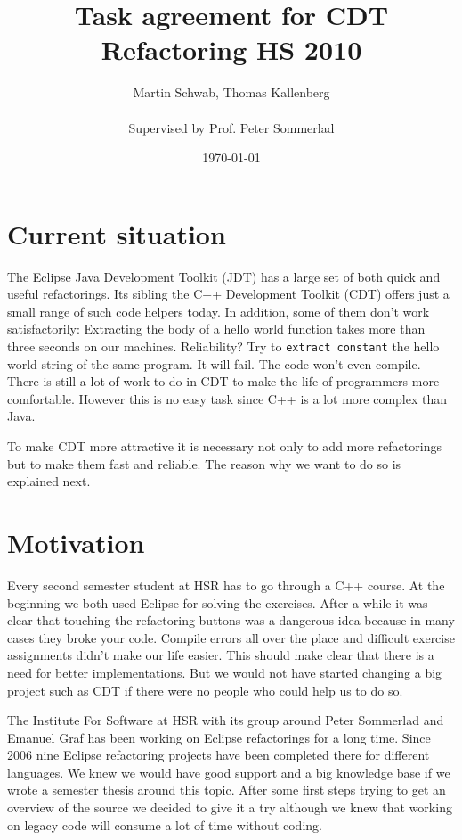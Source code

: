 \documentclass[a4paper,10pt]{scrreprt}
\title{Task agreement for CDT Refactoring HS 2010}
\author{Martin Schwab, Thomas Kallenberg\\ \\Supervised by Prof. Peter Sommerlad}
\date{\today}
\begin{document}
\maketitle

\section{Current situation}

The Eclipse Java Development Toolkit (JDT) has a large set of both quick and useful refactorings. Its sibling the C++ Development Toolkit (CDT) offers just a small range of such code helpers today. In addition, some of them don't work satisfactorily: Extracting the body of a hello world function takes more than three seconds on our machines. Reliability? Try to \texttt{extract constant} the hello world string of the same program. It will fail. The code won't even compile. There is still a lot of work to do in CDT to make the life of programmers more comfortable. However this is no easy task since C++ is a lot more complex than Java.

To make CDT more attractive it is necessary not only to add more refactorings but to make them fast and reliable. The reason why we want to do so is explained next.

\section{Motivation}
Every second semester student at HSR has to go through a C++ course. At the beginning we both used Eclipse for solving the exercises. After a while it was clear that touching the refactoring buttons was a dangerous idea because in many cases they broke your code. Compile errors all over the place and difficult exercise assignments didn't make our life easier. This should make clear that there is a need for better implementations. But we would not have started changing a big project such as CDT if there were no people who could help us to do so.

The Institute For Software at HSR with its group around Peter Sommerlad and Emanuel Graf has been working on Eclipse refactorings for a long time. Since 2006 nine Eclipse refactoring projects have been completed there for different languages. We knew we would have good support and a big knowledge base if we wrote a semester thesis around this topic. After some first steps trying to get an overview of the source we decided to give it a try although we knew that working on legacy code will consume a lot of time without coding.
\end{document}
